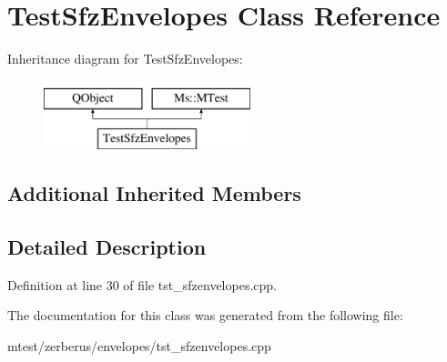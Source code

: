 \hypertarget{class_test_sfz_envelopes}{}\section{Test\+Sfz\+Envelopes Class Reference}
\label{class_test_sfz_envelopes}
Inheritance diagram for Test\+Sfz\+Envelopes\+:\begin{figure}[H]
\begin{center}
\leavevmode
\includegraphics[height=2.000000cm]{class_test_sfz_envelopes}
\end{center}
\end{figure}
\subsection*{Additional Inherited Members}


\subsection{Detailed Description}


Definition at line 30 of file tst\+\_\+sfzenvelopes.\+cpp.



The documentation for this class was generated from the following file\+:\begin{DoxyCompactItemize}
\item 
mtest/zerberus/envelopes/tst\+\_\+sfzenvelopes.\+cpp\end{DoxyCompactItemize}
